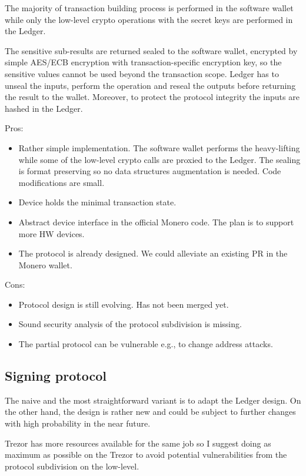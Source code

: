 \documentclass[]{article}
\begin{document}
The majority of transaction building process is performed in the software wallet while only the low-level crypto operations with the secret keys are performed in the Ledger.  

The sensitive sub-results are returned sealed to the software wallet, encrypted by simple AES/ECB encryption with transaction-specific encryption key, so the sensitive values cannot be used beyond the transaction scope. Ledger has to unseal the inputs, perform the operation and reseal the outputs before returning the result to the wallet. Moreover, to protect the protocol integrity the inputs are hashed in the Ledger. 

\;
\noindent Pros:
\begin{itemize}
	\item Rather simple implementation. The software wallet performs the heavy-lifting while some of the 
	low-level crypto calls are proxied to the Ledger. The sealing is format preserving so no data structures augmentation is needed. Code modifications are small.
	\item Device holds the minimal transaction state.
	\item Abstract device interface in the official Monero code. The plan is to support more HW devices.
	\item The protocol is already designed. We could alleviate an existing PR\cite{ledger_pr} in the Monero wallet.
\end{itemize}

\noindent Cons:
\begin{itemize}
	\item Protocol design is still evolving. Has not been merged yet.
	\item Sound security analysis of the protocol subdivision is missing. 
	\item The partial protocol can be vulnerable e.g., to change address attacks.
\end{itemize}

\subsection{Signing protocol}

The naive and the most straightforward variant is to adapt the Ledger design. On the other hand, the design is rather new and could be subject to further changes with high probability in the near future. 

Trezor has more resources available for the same job so I suggest doing as maximum as possible on the Trezor to avoid potential vulnerabilities from the protocol subdivision on the low-level.
\end{document}
